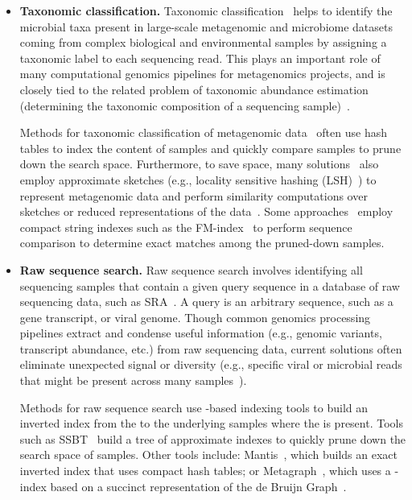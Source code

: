 \begin{itemize}[leftmargin=*]

\item \textbf{Taxonomic classification.} Taxonomic classification~\cite{wood2014kraken} helps to identify the microbial  taxa present in large-scale metagenomic and microbiome datasets coming from complex biological and environmental samples by assigning a taxonomic label to each sequencing read. This plays an important role of many computational genomics pipelines for metagenomics projects, and is closely tied to the related problem of taxonomic abundance estimation (determining the taxonomic composition of a sequencing sample)~\cite{truong2015metaphlan2,skoufos2022agamemnon,wei2022kmcp}.

Methods for taxonomic classification of metagenomic data~\cite{wood2014kraken} often use hash tables to index the \kmer content of samples and quickly compare samples to prune down the search space.
Furthermore, to save space, many solutions~\cite{wood2019improved} also employ approximate sketches (e.g., locality sensitive hashing (LSH)~\cite{roberts2004reducing}) to represent metagenomic data and perform similarity computations over sketches or reduced representations of the data~\cite{Shaw2023}.
Some approaches~\cite{kim2016centrifuge} employ compact string indexes such as the FM-index~\cite{ferragina2000opportunistic} to perform sequence comparison to determine exact matches among the pruned-down samples. 

\item \textbf{Raw sequence search.} Raw sequence search involves identifying all sequencing samples that contain a given query sequence in a database of raw sequencing data, such as SRA~\cite{kodama2012sequence}. A query is an arbitrary sequence, such as a gene transcript, or viral genome. Though common genomics processing pipelines extract and condense useful information (e.g., genomic variants, transcript abundance, etc.) from raw sequencing data, current solutions often eliminate unexpected signal or diversity (e.g., specific viral or microbial reads that might be present across many samples~\cite{Edgar2022}). 

Methods for raw sequence search use \kmer-based indexing tools to build an inverted index from the \kmers to the underlying samples where the \kmer is present. Tools such as SSBT~\cite{solomon2016fast} build a tree of approximate \kmer indexes to quickly prune down the search space of samples. Other tools include:  Mantis~\cite{PandeyABFJP18Cell}, which builds an exact inverted index that uses compact hash tables; or Metagraph~\cite{Karasikov2020}, which uses a \kmer-index based on a succinct representation of the de Bruijn Graph~\cite{bowe2012succinct}.


\end{itemize}
